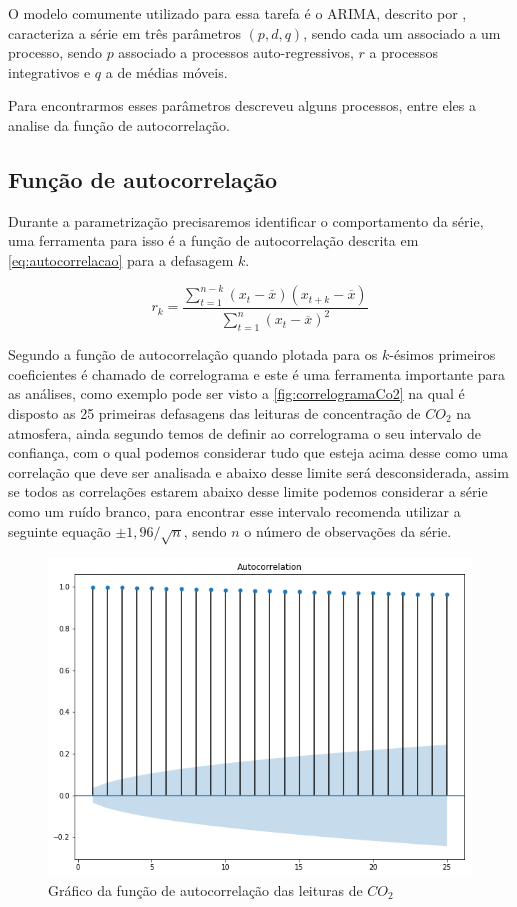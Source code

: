 \documentclass[
    12pt,
    oneside,
    a4paper,
    english,
    brazil
]{abntex2}
\begin{document}
O modelo comumente utilizado para essa tarefa é o ARIMA, descrito por
, caracteriza a série em três parâmetros $(p,d,q)$, sendo cada
um associado a um processo, sendo $p$ associado a processos auto-regressivos,
$r$ a processos integrativos e $q$ a de médias móveis.

Para encontrarmos esses parâmetros  descreveu alguns processos,
entre eles a analise da função de autocorrelação.

\subsection{Função de autocorrelação}\label{sec:corre}

Durante a parametrização precisaremos identificar o comportamento da série, uma
ferramenta para isso é a função de autocorrelação descrita em
\autoref{eq:autocorrelacao} para a defasagem $k$.

\begin{equation}
    \label{eq:autocorrelacao}
    r_k = \frac{\sum_{t=1}^{n-k}{(x_t - \overline{x})(x_{t+k} -
    \overline{x})}}{\sum_{t=1}^{n}{(x_t - \overline{x})^2}}
\end{equation}

Segundo  a função de autocorrelação quando plotada para os
$k$-ésimos primeiros coeficientes é chamado de correlograma e este é uma
ferramenta importante para as análises, como exemplo pode ser visto a
\autoref{fig:correlogramaCo2} na qual é disposto as 25 primeiras defasagens das
leituras de concentração de $CO_2$ na atmosfera, ainda segundo
 temos de definir ao correlograma o seu intervalo de
confiança, com o qual podemos considerar tudo que esteja acima desse como uma
correlação que deve ser analisada e abaixo desse limite será desconsiderada,
assim se todos as correlações estarem abaixo desse limite podemos considerar a
série como um ruído branco, para encontrar esse intervalo 
recomenda utilizar a seguinte equação $\pm{}1,96/\sqrt{n}$, sendo $n$ o número
de observações da série.

\begin{figure}
    \centering
    \caption{Gráfico da função de autocorrelação das leituras de
    $CO_2$}\label{fig:correlogramaCo2}
    \includegraphics[width=.6\linewidth]{images/acf_co2.png}
\end{figure}
\end{document}

